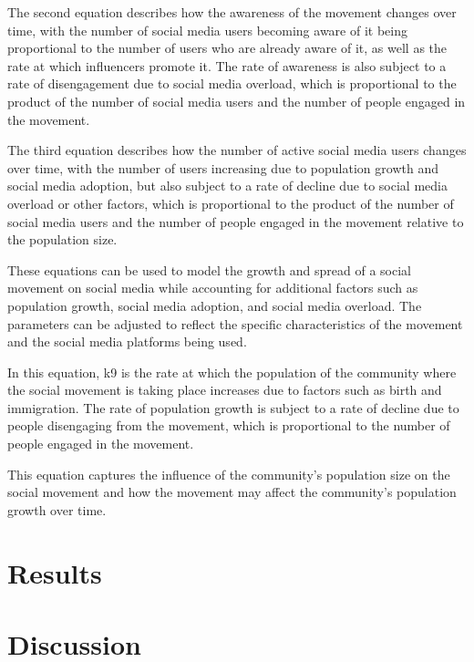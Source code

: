 \documentclass{article}
\begin{document}
        The second equation describes how the awareness of the movement changes over time, with the number of social media users becoming aware of it being proportional to the number of users who are already aware of it, as well as the rate at which influencers promote it. The rate of awareness is also subject to a rate of disengagement due to social media overload, which is proportional to the product of the number of social media users and the number of people engaged in the movement.
        
        The third equation describes how the number of active social media users changes over time, with the number of users increasing due to population growth and social media adoption, but also subject to a rate of decline due to social media overload or other factors, which is proportional to the product of the number of social media users and the number of people engaged in the movement relative to the population size.
        
        These equations can be used to model the growth and spread of a social movement on social media while accounting for additional factors such as population growth, social media adoption, and social media overload. The parameters can be adjusted to reflect the specific characteristics of the movement and the social media platforms being used.

        In this equation, k9 is the rate at which the population of the community where the social movement is taking place increases due to factors such as birth and immigration. The rate of population growth is subject to a rate of decline due to people disengaging from the movement, which is proportional to the number of people engaged in the movement.

        This equation captures the influence of the community's population size on the social movement and how the movement may affect the community's population growth over time.
    \section{Results}
    \section{Discussion}
    \newpage
    
    
    
\end{document}
